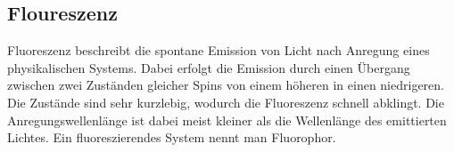 \subsection{Floureszenz}
    Fluoreszenz beschreibt die spontane Emission von Licht nach Anregung eines physikalischen Systems. Dabei erfolgt die Emission durch einen Übergang zwischen zwei Zuständen gleicher Spins von einem höheren in einen niedrigeren. Die Zustände sind sehr kurzlebig, wodurch die Fluoreszenz schnell abklingt. Die Anregungswellenlänge ist dabei meist kleiner als die Wellenlänge des emittierten Lichtes. Ein fluoreszierendes System nennt man Fluorophor.